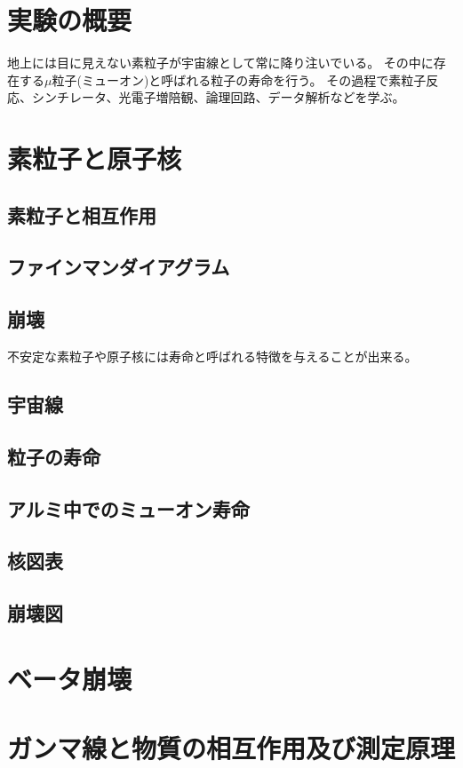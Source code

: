 \documentclass{jarticle}
\begin{document}
 \section*{実験の概要}
 地上には目に見えない素粒子が宇宙線として常に降り注いでいる。
 その中に存在する$\mu$粒子(ミューオン)と呼ばれる粒子の寿命を行う。
 その過程で素粒子反応、シンチレータ、光電子増陪観、論理回路、データ解析などを学ぶ。
 \section{素粒子と原子核}

  \subsection{素粒子と相互作用}
  \subsection{ファインマンダイアグラム}
  \subsection{崩壊}
不安定な素粒子や原子核には寿命と呼ばれる特徴を与えることが出来る。
  \subsection{宇宙線}
  \subsection{粒子の寿命}
  \subsection{アルミ中でのミューオン寿命}
  \subsection{核図表}
  \subsection{崩壊図}
  \section{ベータ崩壊}
  
  
 \section{ガンマ線と物質の相互作用及び測定原理}
\end{document}
